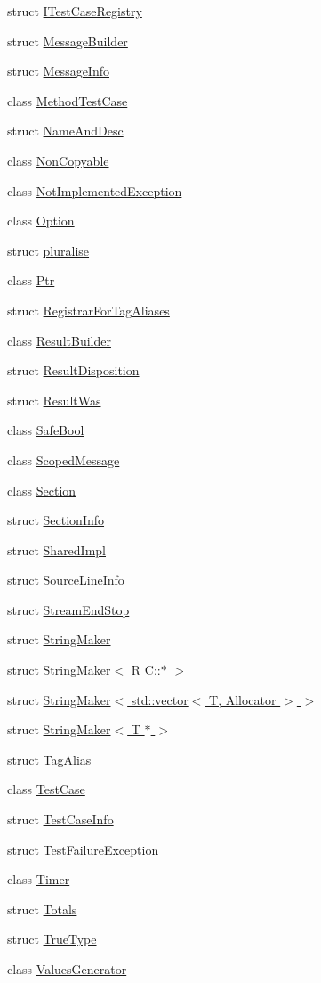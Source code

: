 \begin{DoxyCompactItemize}
struct \hyperlink{a00046}{I\+Test\+Case\+Registry}
\item 
struct \hyperlink{a00049}{Message\+Builder}
\item 
struct \hyperlink{a00050}{Message\+Info}
\item 
class \hyperlink{a00051}{Method\+Test\+Case}
\item 
struct \hyperlink{a00053}{Name\+And\+Desc}
\item 
class \hyperlink{a00054}{Non\+Copyable}
\item 
class \hyperlink{a00055}{Not\+Implemented\+Exception}
\item 
class \hyperlink{a00063}{Option}
\item 
struct \hyperlink{a00064}{pluralise}
\item 
class \hyperlink{a00065}{Ptr}
\item 
struct \hyperlink{a00066}{Registrar\+For\+Tag\+Aliases}
\item 
class \hyperlink{a00067}{Result\+Builder}
\item 
struct \hyperlink{a00068}{Result\+Disposition}
\item 
struct \hyperlink{a00069}{Result\+Was}
\item 
class \hyperlink{a00070}{Safe\+Bool}
\item 
class \hyperlink{a00071}{Scoped\+Message}
\item 
class \hyperlink{a00072}{Section}
\item 
struct \hyperlink{a00073}{Section\+Info}
\item 
struct \hyperlink{a00074}{Shared\+Impl}
\item 
struct \hyperlink{a00075}{Source\+Line\+Info}
\item 
struct \hyperlink{a00077}{Stream\+End\+Stop}
\item 
struct \hyperlink{a00078}{String\+Maker}
\item 
struct \hyperlink{a00079}{String\+Maker$<$ R C\+::$\ast$ $>$}
\item 
struct \hyperlink{a00080}{String\+Maker$<$ std\+::vector$<$ T, Allocator $>$ $>$}
\item 
struct \hyperlink{a00081}{String\+Maker$<$ T $\ast$ $>$}
\item 
struct \hyperlink{a00084}{Tag\+Alias}
\item 
class \hyperlink{a00085}{Test\+Case}
\item 
struct \hyperlink{a00086}{Test\+Case\+Info}
\item 
struct \hyperlink{a00087}{Test\+Failure\+Exception}
\item 
class \hyperlink{a00088}{Timer}
\item 
struct \hyperlink{a00089}{Totals}
\item 
struct \hyperlink{a00090}{True\+Type}
\item 
class \hyperlink{a00091}{Values\+Generator}
\end{DoxyCompactItemize}
